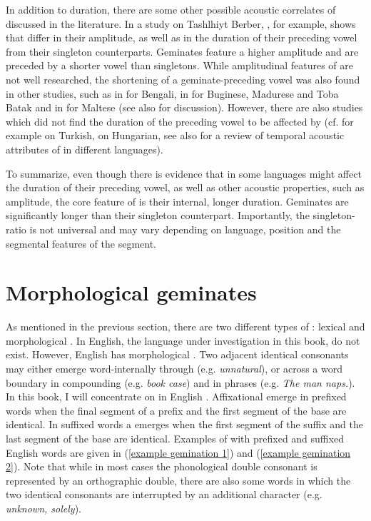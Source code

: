 In addition to duration, there are some other possible acoustic correlates of  discussed in the literature. In a study on Tashlhiyt Berber, \cite{Ridouane.2010}, for example, shows  that  differ in their  amplitude, as well as in the duration of their preceding vowel from their singleton counterparts. Geminates feature a higher amplitude and are preceded by a shorter vowel than singletons. While amplitudinal features of  are not well researched,  the shortening of a geminate-preceding vowel was also found in other studies, such as in \cite{Lahiri.1988} for Bengali, in \cite{Cohn.1999} for Buginese, Madurese and Toba Batak and in  \cite{Galea.2016} for Maltese (see also \citealt{Maddieson.1985} for discussion). However, there are also studies which did not find the duration of the preceding vowel to be affected by  (cf. for example \citealt{Lahiri.1988} on Turkish, \citealt{Ham.2001} on Hungarian, see also \citealt[6]{Ridouane.2010} for a review of temporal acoustic attributes of  in different languages).

To summarize, even though there is evidence that in some languages  might affect the duration of their preceding vowel, as well as other acoustic properties, such as amplitude, the core feature of  is their internal, longer duration. Geminates are significantly longer than their singleton counterpart. Importantly, the singleton- ratio is not universal and may vary depending on language,  position and the segmental features of the segment.



\section{Morphological geminates}\label{Morphological Gemination}

As mentioned in the previous section, there are two different types of : lexical and morphological . In English, the language under investigation in this book,  do not exist. However, English has morphological . Two adjacent identical consonants may either emerge word-internally through  (e.g. \textit{unnatural}), or across a word boundary in compounding (e.g. \textit{book case}) and in phrases (e.g. \textit{The man naps.}). In this book, I will concentrate on  in English . Affixational  emerge in prefixed words when the final segment of a prefix and the first segment of the base are identical. In suffixed words a  emerges when the first segment of the suffix and the last segment of the base are identical. Examples of  with prefixed and suffixed English words are given in (\ref{example gemination 1}) and (\ref{example gemination 2}). Note that while in most cases the phonological double consonant is represented by an orthographic double, there are also some words in which the two identical consonants are interrupted by  an additional character (e.g. \textit{unknown, solely}).

